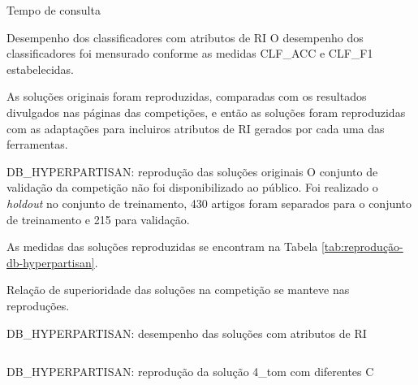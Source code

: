 \documentclass[%
  10pt,%
  aspectratio = 169,%
  compress,%
  t,%
]{beamer}%
\begin{document}
    \begin{frame}{}{Tempo de consulta}
        \vspace{-0.5cm}
        
    \end{frame}

    \begin{frame}{}{Desempenho dos classificadores com atributos de RI}
        O desempenho dos classificadores foi mensurado conforme as medidas CLF\_ACC e CLF\_F1 estabelecidas.

        As soluções originais foram reproduzidas, comparadas com os resultados divulgados nas páginas das competições, e então as soluções foram reproduzidas com as adaptações para incluiros atributos de RI gerados por cada uma das ferramentas.
    \end{frame}

    \begin{frame}{}{DB\_HYPERPARTISAN: reprodução das soluções originais}
        O conjunto de validação da competição não foi disponibilizado ao público.
        Foi realizado o \textit{holdout} no conjunto de treinamento, 430 artigos foram separados para o conjunto de treinamento e 215 para validação.

        As medidas das soluções reproduzidas se encontram na Tabela \ref{tab:reprodução-db-hyperpartisan}.
        
        

        Relação de superioridade das soluções na competição se manteve nas reproduções.

    \end{frame}

    
    \begin{frame}{}{DB\_HYPERPARTISAN: desempenho das soluções com atributos de RI}
        \begin{columns}[T]
                \vspace{-0.5cm}
                
                \vspace{-0.5cm}
                
        \end{columns}
    \end{frame}
    
    \begin{frame}{}{DB\_HYPERPARTISAN: reprodução da solução 4\_tom com diferentes C}
        \begin{columns}[T]
                \vspace{-0.5cm}
                
                \vspace{-0.5cm}
                
        \end{columns}
    \end{frame}
\end{document}
